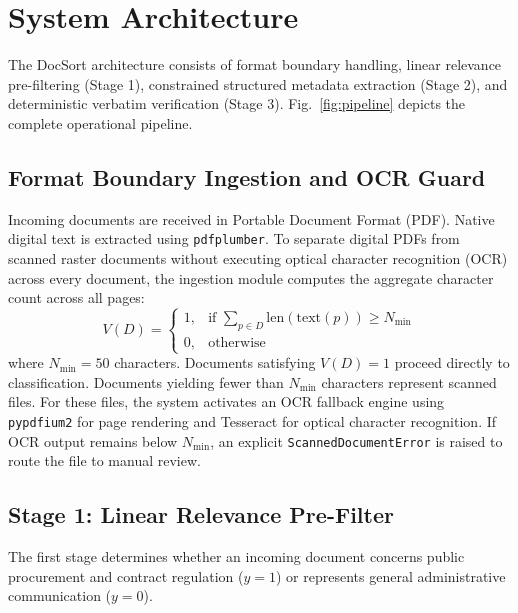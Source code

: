 \documentclass[conference]{IEEEtran}
\begin{document}
\section{System Architecture}

The DocSort architecture consists of format boundary handling, linear relevance pre-filtering (Stage 1), constrained structured metadata extraction (Stage 2), and deterministic verbatim verification (Stage 3). Fig.~\ref{fig:pipeline} depicts the complete operational pipeline.

\subsection{Format Boundary Ingestion and OCR Guard}
Incoming documents are received in Portable Document Format (PDF). Native digital text is extracted using \texttt{pdfplumber}. To separate digital PDFs from scanned raster documents without executing optical character recognition (OCR) across every document, the ingestion module computes the aggregate character count across all pages:
\begin{equation}
    V(D) = \begin{cases}
    1, & \text{if } \sum_{p \in D} \text{len}(\text{text}(p)) \ge N_{\min} \\
    0, & \text{otherwise}
    \end{cases}
\end{equation}
where $N_{\min} = 50$ characters. Documents satisfying $V(D) = 1$ proceed directly to classification. Documents yielding fewer than $N_{\min}$ characters represent scanned files. For these files, the system activates an OCR fallback engine using \texttt{pypdfium2} for page rendering and Tesseract \cite{smith2007overview} for optical character recognition. If OCR output remains below $N_{\min}$, an explicit \texttt{ScannedDocumentError} is raised to route the file to manual review.

\subsection{Stage 1: Linear Relevance Pre-Filter}
The first stage determines whether an incoming document concerns public procurement and contract regulation ($y = 1$) or represents general administrative communication ($y = 0$).
\end{document}
